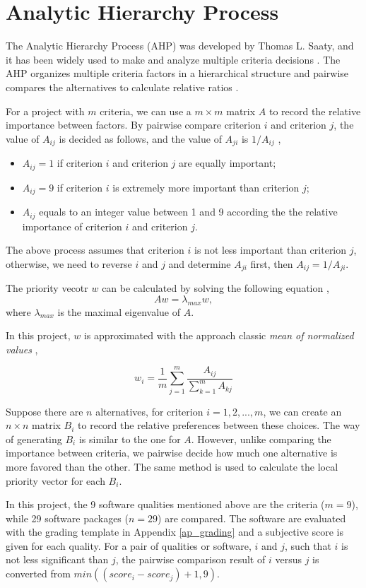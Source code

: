 \section{Analytic Hierarchy Process}
The Analytic Hierarchy Process (AHP) was developed by Thomas L. Saaty, and it has been widely used to make and analyze multiple criteria decisions \cite{VaidyaEtAl2006}. The AHP organizes multiple criteria factors in a hierarchical structure and pairwise compares the alternatives to calculate relative ratios \cite{Saaty1990}.

For a project with $ m $ criteria, we can use a  $m\times m$ matrix $A$ to record the relative importance between factors. By pairwise compare criterion $i$ and criterion $j$, the value of $A_{ij}$ is decided as follows, and the value of $A_{ji}$ is $1/A_{ij}$ \cite{Saaty1990},
\begin{itemize}
\item $A_{ij} = 1$ if criterion $i$ and criterion $j$ are equally important;
\item $A_{ij} = 9$ if criterion $i$ is extremely more important than criterion $j$;
\item $A_{ij}$ equals to an integer value between 1 and 9 according the the relative importance of criterion $i$ and criterion $j$.
\end{itemize}

The above process assumes that criterion $i$ is not less important than criterion $j$, otherwise, we need to reverse $i$ and $j$ and determine $A_{ji}$ first, then $A_{ij} = 1/A_{ji}$.

The priority vecotr $w$ can be calculated by solving the following equation \cite{Saaty1990}, \begin{equation}
Aw = \lambda_{max}w,
\end{equation}
where $\lambda_{max}$ is the maximal eigenvalue of $A$.

In this project, $w$ is approximated with the approach classic \textit{mean of normalized values}  \cite{AlessioEtAl2006},

\begin{equation}
w_i = \frac{1}{m}\sum_{j=1}^{m}\frac{A_{ij}}{\sum_{k=1}^{m}A_{kj}}
\end{equation}

Suppose there are $n$ alternatives, for criterion $i = 1, 2, ... , m$, we can create an $n\times n$ matrix $B_i$ to record the relative preferences between these choices. The way of generating $B_i$ is similar to the one for $A$. However, unlike comparing the importance between criteria, we pairwise decide how much one alternative is more favored than the other. The same method is used to calculate the local priority vector for each $B_i$.

In this project, the 9 software qualities mentioned above are the criteria ($m = 9$), while 29 software packages ($n = 29$) are compared. The software are evaluated with the grading template in Appendix \ref{ap_grading} and a subjective score is given for each quality. For a pair of qualities or software, $i$ and $j$, such that $i$ is not less significant than $j$, the pairwise comparison result of $i$ versus $j$ is converted from $min((score_i - score_j) + 1, 9)$.

